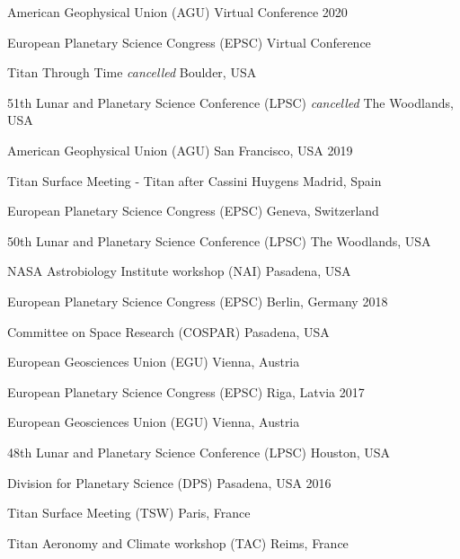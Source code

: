 
\begin{cvhonors}

    \cvhonor
    {American Geophysical Union (AGU)}
    {}
    {Virtual Conference}
    {2020}

    \cvhonor
    {European Planetary Science Congress (EPSC)}
    {}
    {Virtual Conference}
    {}

    \cvhonor
    {Titan Through Time}
    {\textit{\scriptsize cancelled}}
    {Boulder, USA}
    {}

    \cvhonor
    {51th Lunar and Planetary Science Conference (LPSC)}
    {\textit{\scriptsize cancelled}}
    {The Woodlands, USA}
    {}

    \cvhonor
    {American Geophysical Union (AGU)}
    {}
    {San Francisco, USA}
    {2019}

    \cvhonor
    {Titan Surface Meeting - Titan after Cassini Huygens}
    {}
    {Madrid, Spain}
    {}

    \cvhonor
    {European Planetary Science Congress (EPSC)}
    {}
    {Geneva, Switzerland}
    {}

    \cvhonor
    {50th Lunar and Planetary Science Conference (LPSC)}
    {}
    {The Woodlands, USA}
    {}

    \cvhonor
    {NASA Astrobiology Institute workshop (NAI)}
    {}
    {Pasadena, USA}
    {}

    \cvhonor
    {European Planetary Science Congress (EPSC)}
    {}
    {Berlin, Germany}
    {2018}

    \cvhonor
    {Committee on Space Research (COSPAR)}
    {}
    {Pasadena, USA}
    {}

    \cvhonor
    {European Geosciences Union (EGU)}
    {}
    {Vienna, Austria}
    {}

    \cvhonor
    {European Planetary Science Congress (EPSC)}
    {}
    {Riga, Latvia}
    {2017}

  \cvhonor
    {European Geosciences Union (EGU)}
    {}
    {Vienna, Austria}
    {}

  \cvhonor
    {48th Lunar and Planetary Science Conference (LPSC)}
    {}
    {Houston, USA}
    {}

  \cvhonor
    {Division for Planetary Science (DPS)}
    {}
    {Pasadena, USA}
    {2016}

  \cvhonor
    {Titan Surface Meeting (TSW)}
    {}
    {Paris, France}
    {}

    \cvhonor
    {Titan Aeronomy and Climate workshop (TAC)}
    {}
    {Reims, France}
    {}


\end{cvhonors}
